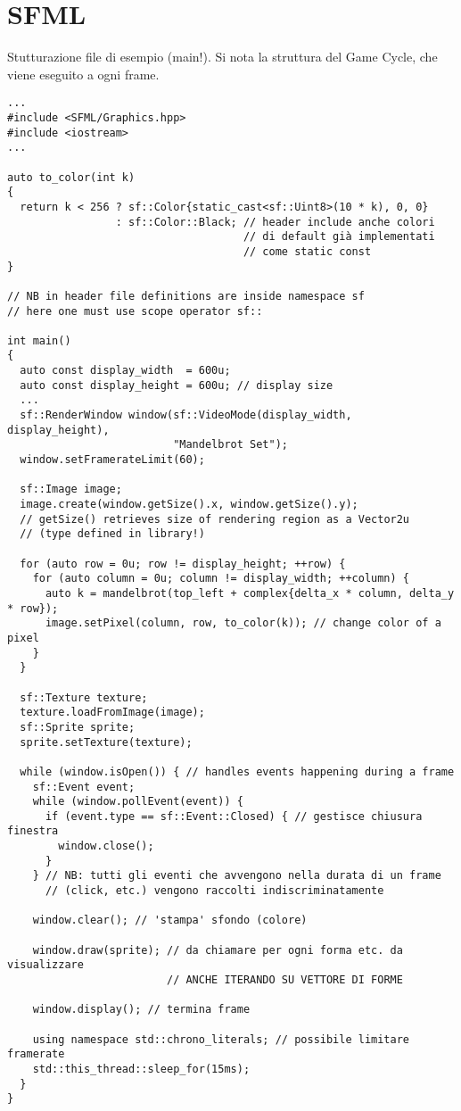 \documentclass[10pt, oneside]{Book}
\begin{document}
\chapter{SFML}
Stutturazione file di esempio (main!). Si nota la struttura del Game Cycle, che viene eseguito a ogni frame. 
\begin{verbatim}
...
#include <SFML/Graphics.hpp>
#include <iostream>
...

auto to_color(int k)
{
  return k < 256 ? sf::Color{static_cast<sf::Uint8>(10 * k), 0, 0}
                 : sf::Color::Black; // header include anche colori
                                     // di default già implementati
                                     // come static const
}

// NB in header file definitions are inside namespace sf
// here one must use scope operator sf:: 

int main()
{
  auto const display_width  = 600u;
  auto const display_height = 600u; // display size
  ...
  sf::RenderWindow window(sf::VideoMode(display_width, display_height),
                          "Mandelbrot Set");
  window.setFramerateLimit(60);

  sf::Image image; 
  image.create(window.getSize().x, window.getSize().y);
  // getSize() retrieves size of rendering region as a Vector2u
  // (type defined in library!)

  for (auto row = 0u; row != display_height; ++row) {
    for (auto column = 0u; column != display_width; ++column) {
      auto k = mandelbrot(top_left + complex{delta_x * column, delta_y * row});
      image.setPixel(column, row, to_color(k)); // change color of a pixel
    }
  }

  sf::Texture texture;
  texture.loadFromImage(image);
  sf::Sprite sprite;
  sprite.setTexture(texture);

  while (window.isOpen()) { // handles events happening during a frame
    sf::Event event;
    while (window.pollEvent(event)) {
      if (event.type == sf::Event::Closed) { // gestisce chiusura finestra
        window.close(); 
      }
    } // NB: tutti gli eventi che avvengono nella durata di un frame
      // (click, etc.) vengono raccolti indiscriminatamente

    window.clear(); // 'stampa' sfondo (colore)

    window.draw(sprite); // da chiamare per ogni forma etc. da visualizzare
                         // ANCHE ITERANDO SU VETTORE DI FORME

    window.display(); // termina frame
    
    using namespace std::chrono_literals; // possibile limitare framerate
    std::this_thread::sleep_for(15ms);
  }
}
\end{verbatim}
\end{document}
